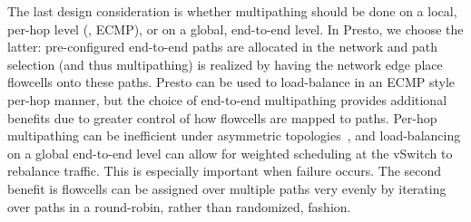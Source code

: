 
The last design consideration is whether multipathing should be done on a local, per-hop level (\eg{}, ECMP), or
on a global, end-to-end level. In Presto, we choose the latter: pre-configured end-to-end paths
are allocated in the network and path selection (and thus multipathing) is realized by having the network edge
place flowcells onto these paths. 
Presto can be used to load-balance in an ECMP style per-hop manner, but the choice of end-to-end 
multipathing provides additional benefits due to greater control of how flowcells are mapped to
paths. Per-hop multipathing can be inefficient
under asymmetric topologies~\cite{wcmp}, and load-balancing on a global end-to-end level can allow
for weighted scheduling at the vSwitch to rebalance traffic. This is especially important when failure occurs.
The second benefit is flowcells can be assigned over multiple paths very evenly
by iterating over paths in a round-robin, rather than randomized, fashion. 

